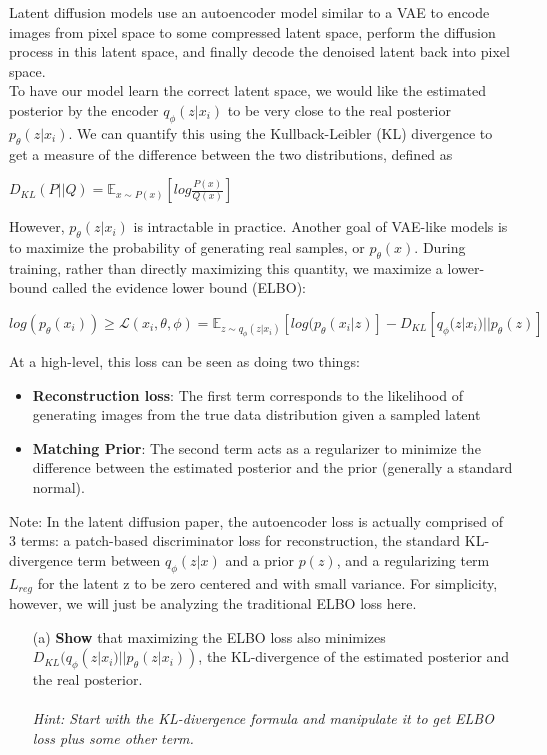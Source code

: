 \documentclass[a4paper]{article}
\begin{document}
Latent diffusion models use an autoencoder model similar to a VAE to encode images from pixel space to some compressed latent space, perform the diffusion process in this latent space, and finally decode the denoised latent back into pixel space. \\

To have our model learn the correct latent space, we would like the estimated posterior by the encoder \(q_{\phi}(z|x_{i})\) to be very close to the real posterior \(p_{\theta}(z|x_i)\). We can quantify this using the Kullback-Leibler (KL) divergence to get a measure of the difference between the two distributions, defined as 
\begin{center}
\(D_{KL}(P||Q) = \mathbb{E}_{x\sim P(x)}[log \frac{P(x)}{Q(x)}]\)
\end{center}

However, \(p_{\theta}(z|x_i)\) is intractable in practice. Another goal of VAE-like models is to maximize the probability of generating real samples, or \(p_{\theta}(x)\). During training, rather than directly maximizing this quantity, we maximize a lower-bound called the evidence lower bound (ELBO):
\begin{center}
\(log(p_{\theta}(x_i)) \ge \mathcal{L}(x_{i}, \theta, \phi) = \mathbb{E}_{z\sim q_{\phi}(z|x_{i})}[log(p_{\theta}(x_i | z)] - D_{KL}[q_{\phi}(z|x_{i}) || p_{\theta}(z)]\)
\end{center}
At a high-level, this loss can be seen as doing two things:
\begin{itemize}
    \item \textbf {Reconstruction loss}: The first term corresponds to the likelihood of generating images from the true data distribution given a sampled latent
    \item \textbf {Matching Prior}: The second term acts as a regularizer to minimize the difference between the estimated posterior and the prior (generally a standard normal).
\end{itemize}
Note: In the latent diffusion paper, the autoencoder loss is actually comprised of 3 terms: a patch-based discriminator loss for reconstruction, the standard KL-divergence term between \(q_{\phi}(z|x)\) and a prior \(p(z)\), and a regularizing term \(L_{reg}\) for the latent z to be zero centered and with small variance. For simplicity, however, we will just be analyzing the traditional ELBO loss here.
\begin{itemize}
    \item [(a)] \textbf {Show} that maximizing the ELBO loss also minimizes \(D_{KL}(q_{\phi}(z|x_{i})||p_{\theta}(z|x_i))\), the KL-divergence of the estimated posterior and the real posterior. \\\\
    \emph {Hint: Start with the KL-divergence formula and manipulate it to get ELBO loss plus some other term.}
    
\end{itemize}
\end{document}
